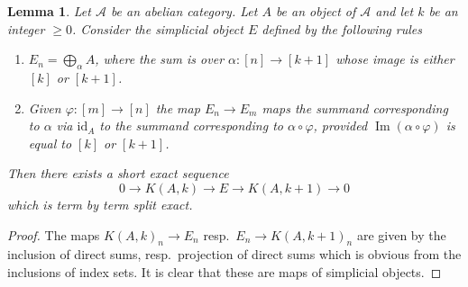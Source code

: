 \documentclass{stacks-project}
\theoremstyle{plain}
\newtheorem{lemma}[subsection]{Lemma}
\theoremstyle{definition}
\theoremstyle{remark}
\numberwithin{equation}{subsection}
\def\Im{\mathop{\mathrm{Im}}}
\begin{document}
\begin{lemma}
\label{lemma-extension}
Let $\mathcal{A}$ be an abelian category.
Let $A$ be an object of $\mathcal{A}$ and
let $k$ be an integer $\geq 0$. Consider the
simplicial object $E$ defined by the following rules
\begin{enumerate}
\item $E_n = \bigoplus_\alpha A$, where the
sum is over $\alpha : [n] \to [k + 1]$ whose
image is either $[k]$ or $[k + 1]$.
\item Given $\varphi : [m] \to [n]$ the map
$E_n \to E_m$ maps the summand corresponding
to $\alpha$ via $\text{id}_A$ to the summand
corresponding to $\alpha \circ \varphi$,
provided $\Im(\alpha \circ \varphi)$
is equal to $[k]$ or $[k + 1]$.
\end{enumerate}
Then there exists a short exact sequence
$$
0 \to K(A, k) \to E \to K(A, k + 1) \to 0
$$
which is term by term split exact.
\end{lemma}

\begin{proof}
The maps $K(A, k)_n \to E_n$ resp.\ $E_n \to K(A, k + 1)_n$
are given by the inclusion of direct sums, resp.\ projection
of direct sums which is obvious from the inclusions of index
sets. It is clear that these are maps of simplicial
objects.
\end{proof}
\end{document}
